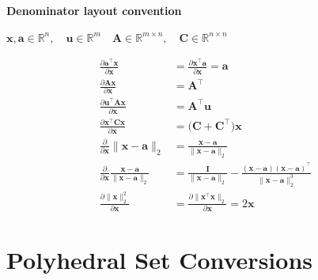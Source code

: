 \documentclass[english]{latex4ei/latex4ei_sheet}
\begin{document}
\begin{sectionbox}
	\textbf{Denominator layout convention} \\
	\begin{center}
		$\bm{x}, \bm{a} \in \mathbb{R}^n, \quad \bm{u} \in \mathbb{R}^m \quad \bm{A} \in \mathbb{R}^{m \times n}, \quad \bm{C} \in \mathbb{R}^{n \times n}$
	\end{center}

	\begin{align}
		\frac{\partial \bm{a}^\intercal \bm{x}}{\partial \bm{x}} & = \frac{\partial \bm{x}^\intercal \bm{a}}{\partial \bm{x}} = \bm{a} \\
		\frac{\partial \bm{A} \bm{x}}{\partial \bm{x}} & = \bm{A}^\intercal \\
		\frac{\partial \bm{u}^\intercal\bm{A}\bm{x}}{\partial \bm{x}} & = \bm{A}^\intercal\bm{u}\\
		\frac{\partial \bm{x}^\intercal \bm{C} \bm{x}}{\partial \bm{x}} & = \big( \bm{C} + \bm{C}^\intercal \big)\bm{x} \\
		\frac{\partial}{\partial \bm{x}} \| \bm{x} - \bm{a} \|_2 & = \frac{\bm{x} - \bm{a}}{\| \bm{x} - \bm{a} \|_2} \\
		\frac{\partial}{\partial \bm{x}} \frac{\bm{x} - \bm{a}}{\| \bm{x} - \bm{a} \|_2} & = \frac{\bm{I}}{\| \bm{x} - \bm{a} \|_2} - \frac{(\bm{x} - \bm{a})(\bm{x} - \bm{a})^\intercal}{\| \bm{x} - \bm{a} \|_2^3} \\
		\frac{\partial \| \bm{x} \|_2^2}{\partial \bm{x}} & = \frac{\partial \| \bm{x}^\intercal \bm{x} \|_2}{\partial \bm{x}} = 2 \bm{x}
	\end{align}

\end{sectionbox}


\section{Polyhedral Set Conversions}
\end{document}
